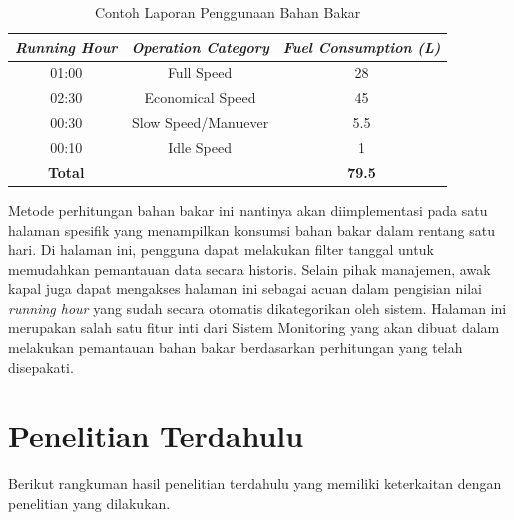\begin{table}[!h]
    \caption{Contoh Laporan Penggunaan Bahan Bakar}
    \centering
     \begin{tabular}{c c c}
        \toprule
        \textit{Running Hour} &
        \textit{Operation Category} &
        \textit{Fuel Consumption (L)} \\ [0.5ex]
        \midrule
        01:00   & Full Speed            & 28    \\
        02:30   & Economical Speed      & 45    \\
        00:30   & Slow Speed/Manuever   & 5.5   \\
        00:10   & Idle Speed            & 1     \\
        \textbf{Total}   &              & \textbf{79.5}     \\ [1ex]
        \bottomrule
     \end{tabular}
     \label{tab:fc-report-example}
\end{table}

Metode perhitungan bahan bakar ini nantinya akan diimplementasi pada satu halaman spesifik yang menampilkan konsumsi bahan bakar dalam rentang satu hari. Di halaman ini, pengguna dapat melakukan filter tanggal untuk memudahkan pemantauan data secara historis. Selain pihak manajemen, awak kapal juga dapat mengakses halaman ini sebagai acuan dalam pengisian nilai \textit{running hour} yang sudah secara otomatis dikategorikan oleh sistem. Halaman ini merupakan salah satu fitur inti dari Sistem Monitoring yang akan dibuat dalam melakukan pemantauan bahan bakar berdasarkan perhitungan yang telah disepakati.

\section{Penelitian Terdahulu}

Berikut rangkuman hasil penelitian terdahulu yang memiliki keterkaitan dengan penelitian yang dilakukan.

